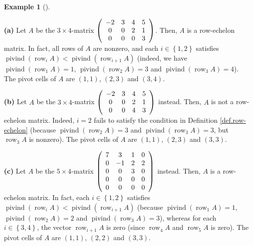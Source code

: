 \documentclass[numbers=enddot,12pt,final,onecolumn,notitlepage]{scrartcl}%
\theoremstyle{definition}
\newtheorem{exam}[theo]{Example}
\newenvironment{example}[1][]
{\begin{exam}[#1]\begin{leftbar}}
{\end{leftbar}\end{exam}}
\begin{document}
\begin{example}
\label{exam.row-echelon}\textbf{(a)} Let $A$ be the $3\times4$-matrix $\left(
%
\begin{array}
[c]{cccc}%
-2 & 3 & 4 & 5\\
0 & 0 & 2 & 1\\
0 & 0 & 0 & 3
\end{array}
\right)  $. Then, $A$ is a row-echelon matrix. In fact, all rows of $A$ are
nonzero, and each $i\in\left\{  1,2\right\}  $ satisfies
$\operatorname*{pivind}\left(  \operatorname*{row}\nolimits_{i}A\right)
<\operatorname*{pivind}\left(  \operatorname*{row}\nolimits_{i+1}A\right)  $
(indeed, we have $\operatorname*{pivind}\left(  \operatorname*{row}%
\nolimits_{1}A\right)  =1$, $\operatorname*{pivind}\left(  \operatorname*{row}%
\nolimits_{2}A\right)  =3$ and $\operatorname*{pivind}\left(
\operatorname*{row}\nolimits_{3}A\right)  =4$). The pivot cells of $A$ are
$\left(  1,1\right)  $, $\left(  2,3\right)  $ and $\left(  3,4\right)  $.

\textbf{(b)} Let $A$ be the $3\times4$-matrix $\left(
\begin{array}
[c]{cccc}%
-2 & 3 & 4 & 5\\
0 & 0 & 2 & 1\\
0 & 0 & 4 & 3
\end{array}
\right)  $ instead. Then, $A$ is not a row-echelon matrix. Indeed, $i=2$ fails
to satisfy the condition in Definition \ref{def.row-echelon} (because
$\operatorname*{pivind}\left(  \operatorname*{row}\nolimits_{2}A\right)  =3$
and $\operatorname*{pivind}\left(  \operatorname*{row}\nolimits_{3}A\right)
=3$, but $\operatorname*{row}\nolimits_{3}A$ is nonzero). The pivot cells of
$A$ are $\left(  1,1\right)  $, $\left(  2,3\right)  $ and $\left(
3,3\right)  $.

\textbf{(c)} Let $A$ be the $5\times4$-matrix $\left(
\begin{array}
[c]{cccc}%
7 & 3 & 1 & 0\\
0 & -1 & 2 & 2\\
0 & 0 & 3 & 0\\
0 & 0 & 0 & 0\\
0 & 0 & 0 & 0
\end{array}
\right)  $ instead. Then, $A$ is a row-echelon matrix. In fact, each
$i\in\left\{  1,2\right\}  $ satisfies $\operatorname*{pivind}\left(
\operatorname*{row}\nolimits_{i}A\right)  <\operatorname*{pivind}\left(
\operatorname*{row}\nolimits_{i+1}A\right)  $ (because $\operatorname*{pivind}%
\left(  \operatorname*{row}\nolimits_{1}A\right)  =1$, $\operatorname*{pivind}%
\left(  \operatorname*{row}\nolimits_{2}A\right)  =2$ and
$\operatorname*{pivind}\left(  \operatorname*{row}\nolimits_{3}A\right)  =3$),
whereas for each $i\in\left\{  3,4\right\}  $, the vector $\operatorname*{row}%
\nolimits_{i+1}A$ is zero (since $\operatorname*{row}\nolimits_{4}A$ and
$\operatorname*{row}\nolimits_{5}A$ is zero). The pivot cells of $A$ are
$\left(  1,1\right)  $, $\left(  2,2\right)  $ and $\left(  3,3\right)  $.


\end{example}
\end{document}

